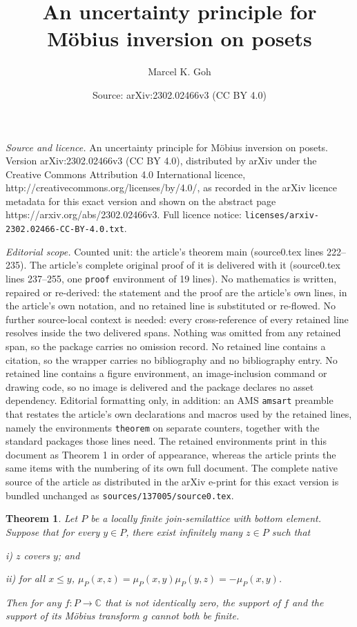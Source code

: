 \documentclass[10pt,a4paper]{amsart}
\title{An uncertainty principle for M\"obius inversion on posets}
\author{Marcel K. Goh}
\date{Source: arXiv:2302.02466v3 (CC BY 4.0)}
\newtheorem{theorem}{Theorem}
\def\CC{\mathbb{C}}
\begin{document}
\maketitle

\noindent\emph{Source and licence.} An uncertainty principle for M\"obius inversion on posets. Version arXiv:2302.02466v3 (CC BY 4.0), distributed by arXiv under the Creative Commons Attribution 4.0 International licence, http://creativecommons.org/licenses/by/4.0/, as recorded in the arXiv licence metadata for this exact version and shown on the abstract page https://arxiv.org/abs/2302.02466v3. Full licence notice: \texttt{licenses/arxiv-2302.02466-CC-BY-4.0.txt}.\par\smallskip

\noindent\textit{Editorial scope.} Counted unit: the article's theorem main (source0.tex lines 222--235). The article's complete original proof of it is delivered with it (source0.tex lines 237--255, one \texttt{proof} environment of 19 lines). No mathematics is written, repaired or re-derived: the statement and the proof are the article's own lines, in the article's own notation, and no retained line is substituted or re-flowed.  No further source-local context is needed: every cross-reference of every retained line resolves inside the two delivered spans.  Nothing was omitted from any retained span, so the package carries no omission record.  No retained line contains a citation, so the wrapper carries no bibliography and no bibliography entry.  No retained line contains a figure environment, an image-inclusion command or drawing code, so no image is delivered and the package declares no asset dependency.  Editorial formatting only, in addition: an AMS \texttt{amsart} preamble that restates the article's own declarations and macros used by the retained lines, namely the environments \texttt{theorem} on separate counters, together with the standard packages those lines need.  The retained environments print in this document as Theorem 1 in order of appearance, whereas the article prints the same items with the numbering of its own full document.  The complete native source of the article as distributed in the arXiv e-print for this exact version is bundled unchanged as \texttt{sources/137005/source0.tex}.
\begin{theorem}\label{main}
Let $P$ be a locally finite
join-semilattice with bottom element. Suppose that for every $y\in P$,
there exist infinitely
many $z\in P$ such that
\medskip
\item{i)} $z$ covers $y$; and
\smallskip
\item{ii)} for all $x\le y$, $\mu_P(x,z) = \mu_P(x,y)\mu_P(y,z) = -\mu_P(x,y)$.

\medskip
\noindent Then for any $f:P\to \CC$ that is not identically zero,
the support of $f$ and the support of its M\"obius transform $g$ cannot both be finite.
\end{theorem}
\end{document}
